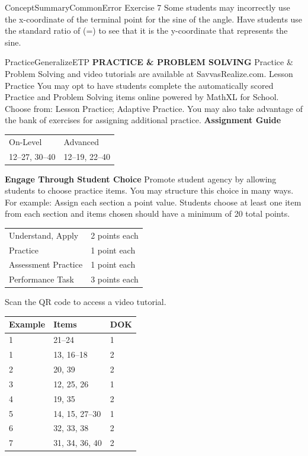 \documentclass{article}
\newenvironment{item-analysis}{}{}      %
\newenvironment{te-addendum}[2]{}{}     %
\newcommand{\te}[1]{}                   %
\begin{document}
\begin{te-addendum}{ConceptSummary}{CommonError}
Exercise 7 Some students may incorrectly use the x-coordinate of the terminal point for the sine of the angle. Have students use the standard ratio of (\sin\theta=) to see that it is the y-coordinate that represents the sine.
\end{te-addendum}
\begin{te-addendum}{Practice}{GeneralizeETP}
\textbf{PRACTICE \& PROBLEM SOLVING}
Practice \& Problem Solving and video tutorials are available at SavvasRealize.com.
Lesson Practice You may opt to have students complete the automatically scored Practice and Problem Solving items online powered by MathXL for School.
Choose from: Lesson Practice; Adaptive Practice.
You may also take advantage of the bank of exercises for assigning additional practice.
\textbf{Assignment Guide}
\begin{tabular}{ll}
On-Level & Advanced \\
12--27, 30--40 & 12--19, 22--40 \\
\end{tabular}
\textbf{Engage Through Student Choice}
Promote student agency by allowing students to choose practice items. You may structure this choice in many ways. For example:
Assign each section a point value. Students choose at least one item from each section and items chosen should have a minimum of 20 total points.
\begin{tabular}{ll}
Understand, Apply & 2 points each \\
Practice & 1 point each \\
Assessment Practice & 1 point each \\
Performance Task & 3 points each \\
\end{tabular}
Scan the QR code to access a video tutorial.
\te{See answers for Exercises 22--24, 28--33 on next page.}
\end{te-addendum}
\begin{item-analysis}
\begin{tabular}{lll}
\toprule
Example & Items & DOK \\
\midrule
1 & 21--24 & 1 \\
1 & 13, 16--18 & 2 \\
2 & 20, 39 & 2 \\
3 & 12, 25, 26 & 1 \\
4 & 19, 35 & 2 \\
5 & 14, 15, 27--30 & 1 \\
6 & 32, 33, 38 & 2 \\
7 & 31, 34, 36, 40 & 2 \\
\bottomrule
\end{tabular}
\end{item-analysis}
\end{document}
